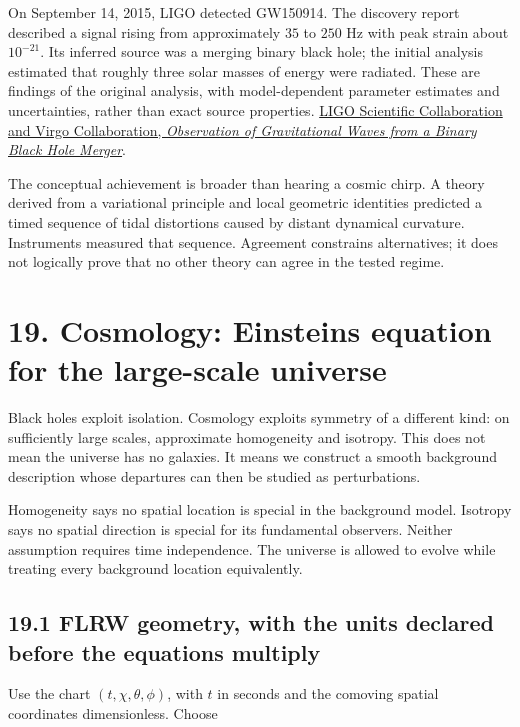 \documentclass[
  11pt,
  letterpaper,
  oneside,
  openany]{scrbook}
\begin{document}
On September 14, 2015, LIGO detected GW150914. The discovery report
described a signal rising from approximately \(35\) to \(250\) Hz with
peak strain about \(10^{-21}\). Its inferred source was a merging binary
black hole; the initial analysis estimated that roughly three solar
masses of energy were radiated. These are findings of the original
analysis, with model-dependent parameter estimates and uncertainties,
rather than exact source properties.
\href{https://arxiv.org/abs/1602.03837}{LIGO Scientific Collaboration
and Virgo Collaboration, \emph{Observation of Gravitational Waves from a
Binary Black Hole Merger}}.

The conceptual achievement is broader than hearing a cosmic chirp. A
theory derived from a variational principle and local geometric
identities predicted a timed sequence of tidal distortions caused by
distant dynamical curvature. Instruments measured that sequence.
Agreement constrains alternatives; it does not logically prove that no
other theory can agree in the tested regime.

\hypertarget{chapter-19}{%
\chapter{19. Cosmology: Einstein\textquotesingle s equation for the
large-scale universe}\label{chapter-19}}

Black holes exploit isolation. Cosmology exploits symmetry of a
different kind: on sufficiently large scales, approximate homogeneity
and isotropy. This does not mean the universe has no galaxies. It means
we construct a smooth background description whose departures can then
be studied as perturbations.

Homogeneity says no spatial location is special in the background model.
Isotropy says no spatial direction is special for its fundamental
observers. Neither assumption requires time independence. The universe
is allowed to evolve while treating every background location
equivalently.

\hypertarget{flrw-geometry-with-the-units-declared-before-the-equations-multiply}{%
\section{19.1 FLRW geometry, with the units declared before the
equations
multiply}\label{flrw-geometry-with-the-units-declared-before-the-equations-multiply}}

Use the chart \((t,\chi,\theta,\phi)\), with \(t\) in seconds and the
comoving spatial coordinates dimensionless. Choose
\end{document}
